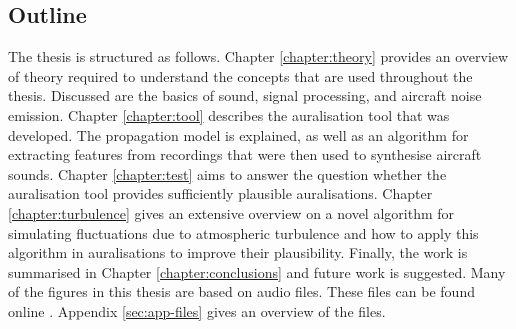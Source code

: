 %
%
%

\subsection{Outline}
The thesis is structured as follows.
\newline
\newline
Chapter \ref{chapter:theory} provides an overview of theory required to
understand the concepts that are used throughout the thesis. Discussed are the
basics of sound, signal processing, and aircraft noise emission.
\newline
\newline
Chapter \ref{chapter:tool} describes the auralisation tool that was developed.
The propagation model is explained, as well as an algorithm for extracting
features from recordings that were then used to synthesise aircraft sounds.
\newline
\newline
Chapter \ref{chapter:test} aims to answer the question whether the auralisation
tool provides sufficiently plausible auralisations.
\newline
\newline
Chapter \ref{chapter:turbulence} gives an extensive overview on a novel
algorithm for simulating fluctuations due to atmospheric turbulence and how to
apply this algorithm in auralisations to improve their plausibility.
\newline
\newline
Finally, the work is summarised in Chapter \ref{chapter:conclusions} and future
work is suggested.
\newline
\newline
Many of the figures in this thesis are based on audio files.
These files can be found online \cite{Rietdijk2017e}.
Appendix \ref{sec:app-files} gives an overview of the files.


